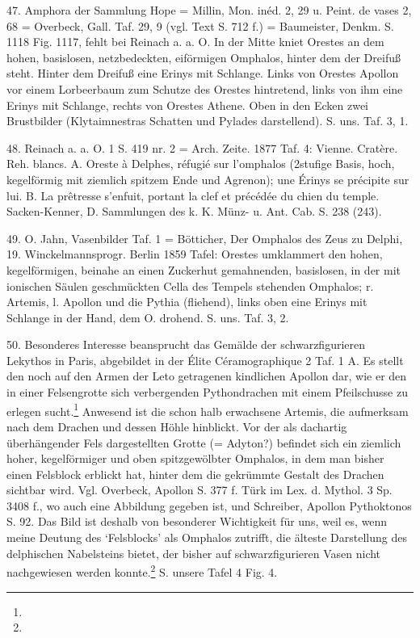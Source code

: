 \documentclass[a4paper, 11pt, oneside]{article}
\begin{document}
47. Amphora der Sammlung Hope = Millin, Mon. inéd. 2, 29 u. Peint. de vases 2, 68 = Overbeck, Gall. Taf. 29, 9 (vgl. Text S. 712 f.) = Baumeister, Denkm. S. 1118 Fig. 1117, fehlt bei Reinach a. a. O. In der Mitte kniet Orestes an dem hohen, basislosen, netzbedeckten, eiförmigen Omphalos, hinter dem der Dreifuß steht. Hinter dem Dreifuß eine Erinys mit Schlange. Links von Orestes Apollon vor einem Lorbeerbaum zum Schutze des Orestes hintretend, links von ihm eine Erinys mit Schlange, rechts von Orestes Athene. Oben in den Ecken zwei Brustbilder (Klytaimnestras Schatten und Pylades darstellend). S. uns. Taf. 3, 1.

48. Reinach a. a. O. 1 S. 419 nr. 2 = Arch. Zeite. 1877 Taf. 4: Vienne. Cratère. Reh. blancs. A. Oreste à Delphes, réfugié sur l'omphalos (2stufige Basis, hoch, kegelförmig mit ziemlich spitzem Ende und Agrenon); une Érinys se précipite sur lui. B. La prêtresse s'enfuit, portant la clef et précédée du chien du temple. Sacken-Kenner, D. Sammlungen des k. K. Münz- u. Ant. Cab. S. 238 (243).

49. O. Jahn, Vasenbilder Taf. 1 = Bötticher, Der Omphalos des Zeus zu Delphi, 19. Winckelmannsprogr. Berlin 1859 Tafel: Orestes umklammert den hohen, kegelförmigen, beinahe an einen Zuckerhut gemahnenden, basislosen, in der mit ionischen Säulen geschmückten Cella des Tempels stehenden Omphalos; r. Artemis, l. Apollon und die Pythia (fliehend), links oben eine Erinys mit Schlange in der Hand, dem O. drohend. S. uns. Taf. 3, 2.

50. Besonderes Interesse beansprucht das Gemälde der schwarzfigurieren Lekythos in Paris, abgebildet in der Élite Céramographique 2 Taf. 1 A. Es stellt den noch auf den Armen der Leto getragenen kindlichen Apollon dar, wie er den in einer Felsengrotte sich verbergenden Pythondrachen mit einem Pfeilschusse zu erlegen sucht.\footnote{} Anwesend ist die schon halb erwachsene Artemis, die aufmerksam nach dem Drachen und dessen Höhle hinblickt. Vor der als dachartig überhängender Fels dargestellten Grotte (= Adyton?) befindet sich ein ziemlich hoher, kegelförmiger und oben spitzgewölbter Omphalos, in dem man bisher einen Felsblock erblickt hat, hinter dem die gekrümmte Gestalt des Drachen sichtbar wird. Vgl. Overbeck, Apollon S. 377 f. Türk im Lex. d. Mythol. 3 Sp. 3408 f., wo auch eine Abbildung gegeben ist, und Schreiber, Apollon Pythoktonos S. 92. Das Bild ist deshalb von besonderer Wichtigkeit für uns, weil es, wenn meine Deutung des `Felsblocks' als Omphalos zutrifft, die älteste Darstellung des delphischen Nabelsteins bietet, der bisher auf schwarzfigurieren Vasen nicht nachgewiesen werden konnte.\footnote{} S. unsere Tafel 4 Fig. 4.
\end{document}
